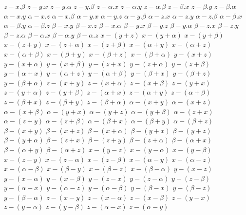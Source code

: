 $ z - x . \beta $
$ z - y . x $
$ z - y . \alpha $
$ z - y . \beta $
$ z - \alpha . x $
$ z - \alpha . y $
$ z - \alpha . \beta $
$ z - \beta . x $
$ z - \beta . y $
$ z - \beta . \alpha $
$ \alpha - x . y $
$ \alpha - x . z $
$ \alpha - x . \beta $
$ \alpha - y . x $
$ \alpha - y . z $
$ \alpha - y . \beta $
$ \alpha - z . x $
$ \alpha - z . y $
$ \alpha - z . \beta $
$ \alpha - \beta . x $
$ \alpha - \beta . y $
$ \alpha - \beta . z $
$ \beta - x . y $
$ \beta - x . z $
$ \beta - x . \alpha $
$ \beta - y . x $
$ \beta - y . z $
$ \beta - y . \alpha $
$ \beta - z . x $
$ \beta - z . y $
$ \beta - z . \alpha $
$ \beta - \alpha . x $
$ \beta - \alpha . y $
$ \beta - \alpha . z $
$ x - (y + z) $
$ x - (y + \alpha) $
$ x - (y + \beta) $
$ x - (z + y) $
$ x - (z + \alpha) $
$ x - (z + \beta) $
$ x - (\alpha + y) $
$ x - (\alpha + z) $
$ x - (\alpha + \beta) $
$ x - (\beta + y) $
$ x - (\beta + z) $
$ x - (\beta + \alpha) $
$ y - (x + z) $
$ y - (x + \alpha) $
$ y - (x + \beta) $
$ y - (z + x) $
$ y - (z + \alpha) $
$ y - (z + \beta) $
$ y - (\alpha + x) $
$ y - (\alpha + z) $
$ y - (\alpha + \beta) $
$ y - (\beta + x) $
$ y - (\beta + z) $
$ y - (\beta + \alpha) $
$ z - (x + y) $
$ z - (x + \alpha) $
$ z - (x + \beta) $
$ z - (y + x) $
$ z - (y + \alpha) $
$ z - (y + \beta) $
$ z - (\alpha + x) $
$ z - (\alpha + y) $
$ z - (\alpha + \beta) $
$ z - (\beta + x) $
$ z - (\beta + y) $
$ z - (\beta + \alpha) $
$ \alpha - (x + y) $
$ \alpha - (x + z) $
$ \alpha - (x + \beta) $
$ \alpha - (y + x) $
$ \alpha - (y + z) $
$ \alpha - (y + \beta) $
$ \alpha - (z + x) $
$ \alpha - (z + y) $
$ \alpha - (z + \beta) $
$ \alpha - (\beta + x) $
$ \alpha - (\beta + y) $
$ \alpha - (\beta + z) $
$ \beta - (x + y) $
$ \beta - (x + z) $
$ \beta - (x + \alpha) $
$ \beta - (y + x) $
$ \beta - (y + z) $
$ \beta - (y + \alpha) $
$ \beta - (z + x) $
$ \beta - (z + y) $
$ \beta - (z + \alpha) $
$ \beta - (\alpha + x) $
$ \beta - (\alpha + y) $
$ \beta - (\alpha + z) $
$ x - (y - z) $
$ x - (y - \alpha) $
$ x - (y - \beta) $
$ x - (z - y) $
$ x - (z - \alpha) $
$ x - (z - \beta) $
$ x - (\alpha - y) $
$ x - (\alpha - z) $
$ x - (\alpha - \beta) $
$ x - (\beta - y) $
$ x - (\beta - z) $
$ x - (\beta - \alpha) $
$ y - (x - z) $
$ y - (x - \alpha) $
$ y - (x - \beta) $
$ y - (z - x) $
$ y - (z - \alpha) $
$ y - (z - \beta) $
$ y - (\alpha - x) $
$ y - (\alpha - z) $
$ y - (\alpha - \beta) $
$ y - (\beta - x) $
$ y - (\beta - z) $
$ y - (\beta - \alpha) $
$ z - (x - y) $
$ z - (x - \alpha) $
$ z - (x - \beta) $
$ z - (y - x) $
$ z - (y - \alpha) $
$ z - (y - \beta) $
$ z - (\alpha - x) $
$ z - (\alpha - y) $
